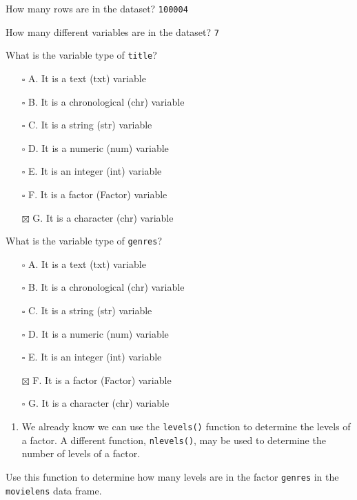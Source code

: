 \documentclass[
]{article}
\providecommand{\tightlist}{%
  \setlength{\itemsep}{0pt}\setlength{\parskip}{0pt}}
\begin{document}
How many rows are in the dataset? \texttt{100004}

How many different variables are in the dataset? \texttt{7}

What is the variable type of \texttt{title}?

\begin{itemize}
\tightlist
\item[$\square$]
  A. It is a text (txt) variable
\item[$\square$]
  B. It is a chronological (chr) variable
\item[$\square$]
  C. It is a string (str) variable
\item[$\square$]
  D. It is a numeric (num) variable
\item[$\square$]
  E. It is an integer (int) variable
\item[$\square$]
  F. It is a factor (Factor) variable
\item[$\boxtimes$]
  G. It is a character (chr) variable
\end{itemize}

What is the variable type of \texttt{genres}?

\begin{itemize}
\tightlist
\item[$\square$]
  A. It is a text (txt) variable
\item[$\square$]
  B. It is a chronological (chr) variable
\item[$\square$]
  C. It is a string (str) variable
\item[$\square$]
  D. It is a numeric (num) variable
\item[$\square$]
  E. It is an integer (int) variable
\item[$\boxtimes$]
  F. It is a factor (Factor) variable
\item[$\square$]
  G. It is a character (chr) variable
\end{itemize}

\begin{enumerate}
\def\labelenumi{\arabic{enumi}.}
\setcounter{enumi}{3}
\tightlist
\item
  We already know we can use the \texttt{levels()} function to determine
  the levels of a factor. A different function, \texttt{nlevels()}, may
  be used to determine the number of levels of a factor.
\end{enumerate}

Use this function to determine how many levels are in the factor
\texttt{genres} in the \texttt{movielens} data frame.
\end{document}
